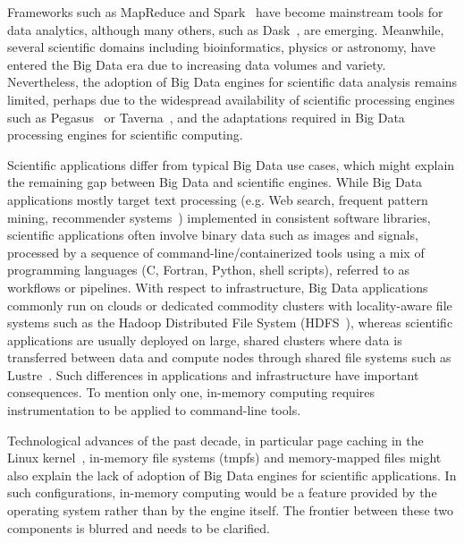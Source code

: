 Frameworks such as MapReduce and Spark~\cite{zaharia2016apache} have become
mainstream tools for data analytics, although many others, such as
Dask~\cite{rocklin2015dask}, are emerging. Meanwhile, several scientific domains
including bioinformatics, physics or astronomy, have entered the Big Data era
due to increasing data volumes and variety. Nevertheless, the adoption of Big
Data engines for scientific data analysis remains limited, perhaps due to the
widespread availability of scientific processing engines such as
Pegasus~\cite{deelman2005pegasus} or Taverna~\cite{oinn2004taverna}, and the
adaptations required in Big Data processing engines for scientific computing. 

Scientific applications differ from typical Big Data use cases, which might
explain the remaining gap between Big Data and scientific engines. While Big
Data applications mostly target text processing (e.g. Web search, frequent
pattern mining, recommender systems~\cite{leskovec2014mining}) implemented in
consistent software libraries, scientific applications often involve binary data
such as images and signals, processed by a sequence of
command-line/containerized tools using a mix of programming languages (C,
Fortran, Python, shell scripts), referred to as workflows or pipelines. With
respect to infrastructure, Big Data applications commonly run on clouds or
dedicated commodity clusters with locality-aware file systems such as the Hadoop
Distributed File System (HDFS~\cite{shvachko2010hadoop}), whereas scientific
applications are usually deployed on large, shared clusters where data is
transferred between data and compute nodes through shared file systems such as
Lustre~\cite{schwan2003lustre}. Such differences in applications and
infrastructure have important consequences. To mention only one, in-memory
computing requires instrumentation to be applied to command-line tools. 

Technological advances of the past decade, in particular page caching in the
Linux kernel~\cite{love2010linux}, in-memory file systems (tmpfs) and
memory-mapped files might also explain the lack of adoption of Big Data engines
for scientific applications. In such configurations, in-memory computing would
be a feature provided by the operating system rather than by the engine itself.
The frontier between these two components is blurred and needs to be clarified.


